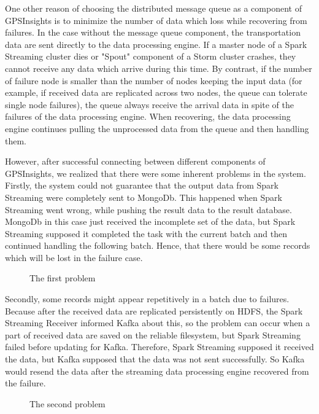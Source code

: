 \documentclass{acm_proc_article-sp}
\begin{document}
One other reason of choosing the distributed message queue as a component of GPSInsights is to minimize the number of data which loss while recovering from failures. In the case without the message queue component, the transportation data are sent directly to the data processing engine. If a master node of a Spark Streaming cluster dies or "Spout" component of a Storm cluster crashes, they cannot receive any data which arrive during this time. By contrast, if the number of failure node is smaller than the number of nodes keeping the input data (for example, if received data are replicated across two nodes, the queue can tolerate single node failures), the queue always receive the arrival data in spite of the failures of the data processing engine. When recovering, the data processing engine continues pulling the unprocessed data from the queue and then handling them.

However, after successful connecting between different components of GPSInsights, we realized that there were some inherent problems in the system. Firstly, the system could not guarantee that the output data from Spark Streaming were completely sent to MongoDb. This happened when Spark Streaming went wrong, while pushing the result data to the result database. MongoDb in this case just received the incomplete set of the data, but Spark Streaming supposed it completed the task with the current batch and then continued handling the following batch. Hence, that there would be some records which will be lost in the failure case.

\begin{figure}[!htb]
\centering
{}
\caption{The first problem}
\end{figure} 

Secondly, some records might appear repetitively in a batch due to failures. Because after the received data are replicated persistently on HDFS, the Spark Streaming Receiver informed Kafka about this, so the problem can occur when a part of received data are saved on the reliable filesystem, but Spark Streaming failed before updating for Kafka. Therefore, Spark Streaming supposed it received the data, but Kafka supposed that the data was not sent successfully. So Kafka would resend the data after the streaming data processing engine recovered from the failure.

 
\begin{figure}[!htb]
\centering
{}
\caption{The second problem}
\end{figure} 
\end{document}
